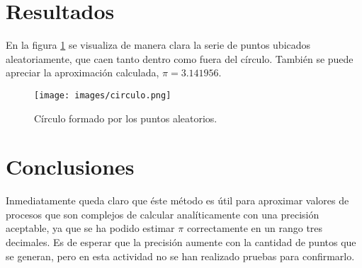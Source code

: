 \documentclass{report}
\begin{document}
\section{Resultados}
En la figura \ref{fig2} se visualiza de manera clara la serie de puntos ubicados aleatoriamente, que caen tanto dentro como fuera del c\'irculo. Tambi\'en se puede apreciar la aproximaci\'on calculada, $\pi=3.141956$.

\begin{figure}
    \centering
    \texttt{[image: images/circulo.png]}
    \caption{C\'irculo formado por los puntos aleatorios.}
    \label{fig2}
\end{figure}

\section{Conclusiones}
Inmediatamente queda claro que \'este m\'etodo es \'util para aproximar valores de procesos que son complejos de calcular anal\'iticamente con una precisi\'on aceptable, ya que se ha podido estimar $\pi$ correctamente en un rango tres decimales. Es de esperar que la precisi\'on aumente con la cantidad de puntos que se generan, pero en esta actividad no se han realizado pruebas para confirmarlo.



\end{document}
